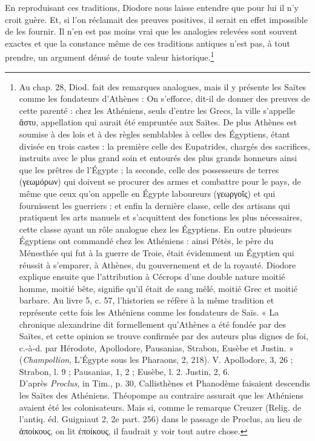 \documentclass[a4paper, 11pt, oneside]{article}
\begin{document}
En reproduisant ces traditions, Diodore nous laisse entendre que pour lui il n'y croit guère. Et, si l'on réclamait des preuves positives, il serait en effet impossible de les fournir. Il n'en est pas moins vrai que les analogies relevées sont souvent exactes et que la constance même de ces traditions antiques n'est pas, à tout prendre, un argument dénué de toute valeur historique.\footnote{Au chap. 28, Diod. fait des remarques analogues, mais il y présente les Saïtes comme les fondateurs d'Athènes : On s'efforce, dit-il de donner des preuves de cette parenté : chez les Athéniens, seuls d'entre les Grecs, la ville s'appelle ἄστυ, appellation qui aurait été empruntée aux Saïtes. De plus Athènes est soumise à des lois et à des règles semblables à celles des Égyptiens, étant divisée en trois castes : la première celle des Eupatrides, chargés des sacrifices, instruits avec le plus grand soin et entourés des plus grands honneurs ainsi que les prêtres de l'Égypte ; la seconde, celle des possesseurs de terres (γεωμόρων) qui doivent se procurer des armes et combattre pour le pays, de même que ceux qu'on appelle en Égypte laboureurs (γεωργοῖς) et qui fournissent les guerriers : et enfin la dernière classe, celle des artisans qui pratiquent les arts manuels et s'acquittent des fonctions les plus nécessaires, cette classe ayant un rôle analogue chez les Égyptiens. En outre plusieurs Égyptiens ont commandé chez les Athéniens : ainsi Pétès, le père du Ménesthée qui fut à la guerre de Troie, était évidemment un Égyptien qui réussit à s'emparer, à Athènes, du gouvernement et de la royauté. Diodore explique ensuite que l'attribution à Cécrops d'une double nature moitié homme, moitié bête, signifie qu'il était de sang mêlé, moitié Grec et moitié barbare.  
Au livre 5, c. 57, l'historien se réfère à la même tradition et représente cette fois les Athéniens comme les fondateurs de Saïs.  
« La chronique alexandrine dit formellement qu'Athènes a été fondée par des Saïtes, et cette opinion se trouve confirmée par des auteurs plus dignes de foi, c.-à-d. par Hérodote, Apollodore, Pausanias, Strabon, Eusèbe et Justin. » (\emph{Champollion}, L'Égypte sous les Pharaons, 2, 218). V. Apollodore, 3, 26 ; Strabon, l. 9 ; Pausanias, 1, 2 ; Eusèbe, l. 2. Justin, 2, 6.\\\hspace*{5mm}D'après \emph{Proclus}, in Tim., p. 30, Callisthènes et Phanodème faisaient descendis les Saïtes des Athéniens. Théopompe au contraire assurait que les Athéniens avaient été les colonisateurs. Mais si, comme le remarque Creuzer (Relig. de l'antiq. éd. Guigniaut 2, 2e part. 256) dans le passage de Proclus, au lieu de ἀποίκους, on lit ἐποίκους, il faudrait y voir tout autre chose.  
}
\end{document}
